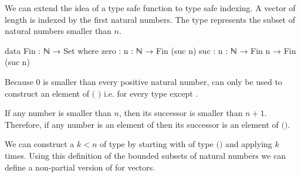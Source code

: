 We can extend the idea of a type safe  function to type safe
indexing.
A vector of length  is indexed by the first 
natural numbers.
The type \AgdaSpace{} represents the subset of
natural numbers smaller than $n$.

\begin{code}
data Fin : ℕ → Set where
  zero  : {n : ℕ} → Fin (suc n)
  suc   : {n : ℕ} → Fin n → Fin (suc n)
\end{code}
Because $0$ is smaller than every positive natural number,
 can only be used to construct an element of
\AgdaSpace{}$($
$)$ i.e. for every type except
\AgdaSpace{}.

If any number is smaller than $n$, then its successor is smaller than $n+1$.
Therefore, if any number is an element of
\AgdaSpace{}
then its successor is an element of
\AgdaSpace{}$($\AgdaSpace{}$)$.

We can construct a $k<n$ of type
\AgdaSpace{} by starting with
 of type
\AgdaSpace{}$($$)$ and applying
 $k$ times.
Using this definition of the bounded subsets of natural numbers we can define
a non-partial version of \AgdaFunction{\_!\_} for vectors.

